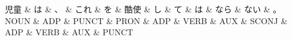 \documentclass[tikz,border=5pt]{standalone}
\begin{document}
\normalsize
\begin{dependency}[edge unit distance=12.0pt]
    \begin{deptext}[column sep=1em]
        児童 \& は \& 、 \& これ \& を \& 酷使 \& し \& て \& は \& なら \& ない \& 。\\
        NOUN \& ADP \& PUNCT \& PRON \& ADP \& VERB \& AUX \& SCONJ \& ADP \& VERB \& AUX \& PUNCT\\
    \end{deptext}
\end{dependency}
\end{document}
